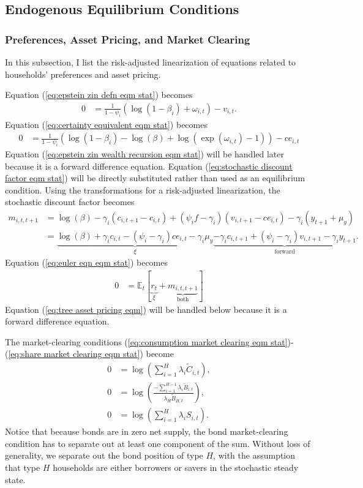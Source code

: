 \documentclass[12 pt, oneside]{article}
\theoremstyle{definition}
\theoremstyle{definition}
\theoremstyle{definition}
\newcommand{\E}{\mathbb{E}}
\begin{document}
\subsection{Endogenous Equilibrium Conditions}

\subsubsection{Preferences, Asset Pricing, and Market Clearing}
In this subsection, I list the risk-adjusted linearization of equations related to households' preferences and asset pricing.

Equation (\ref{eq:epstein zin defn eqm stat}) becomes
\begin{align*}
  0 & = \frac{1}{1 - \psi_i}(\log(1 - \beta_i) + \omega_{i, t}) - v_{i, t}.
\end{align*}
Equation (\ref{eq:certainty equivalent eqm stat}) becomes
\begin{align*}
  0 & = \frac{1}{1 - \psi_i}(\log(1 - \beta_i) - \log(\beta) + \log(\exp(\omega_{i, t}) - 1)) - ce_{i, t}
\end{align*}
Equation (\ref{eq:epstein zin wealth recursion eqm stat}) will be handled later because it is a forward difference equation. Equation (\ref{eq:stochastic discount factor eqm stat}) will be directly substituted rather than used as an equilibrium condition. Using the transformations for a risk-adjusted linearization, the stochastic discount factor becomes
\begin{align*}
  m_{i, t, t + 1} & = \log(\beta)  - \gamma_i (c_{i, t + 1} - c_{i, t}) + (\psi_if - \gamma_i)(v_{i, t + 1} - ce_{i, t}) - \gamma_i(y_{t + 1} + \mu_y)\\
               & = \underbrace{\log(\beta) + \gamma_i c_{i, t} - (\psi_i - \gamma_i) ce_{i, t} - \gamma_i \mu_y}_{\xi} \underbrace{ - \gamma_i c_{i, t + 1} + (\psi_i - \gamma_i) v_{i, t + 1} - \gamma_i y_{t + 1}}_{\text{forward}}.
\end{align*}
Equation (\ref{eq:euler eqn eqm stat}) becomes
\begin{align*}
  0 & = \E_t\left[\underbrace{r_t}_{\xi} + \underbrace{m_{i, t, t + 1}}_{\text{both}}\right]
\end{align*}
Equation (\ref{eq:tree asset pricing eqm}) will be handled below because it is a forward difference equation.

The market-clearing conditions (\ref{eq:consumption market clearing eqm stat})-(\ref{eq:share market clearing eqm stat}) become
\begin{align*}
  0 & = \log\left(\sum_{i = 1}^H \lambda_i\tilde{C}_{i, t}\right),\\
  0 & = \log\left(\frac{-\sum_{i = 1}^{H - 1}\lambda_i \tilde{B}_{i, t}}{\lambda_H \tilde{B}_{H, t}}\right),\\
  0 & = \log\left(\sum_{i = 1}^H \lambda_iS_{i, t}\right).
\end{align*}
Notice that because bonds are in zero net supply, the bond market-clearing condition has to separate out at least one component of the sum. Without loss of generality,
we separate out the bond position of type $H$, with the assumption that type $H$ households are either borrowers or savers in the stochastic steady state.
\end{document}
